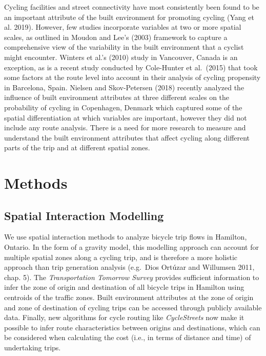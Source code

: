 \documentclass[smallextended]{svjour3}       %
\begin{document}
Cycling facilities and street connectivity have most consistently been
found to be an important attribute of the built environment for
promoting cycling (Yang et al. 2019). However, few studies incorporate
variables at two or more spatial scales, as outlined in Moudon and Lee's
(2003) framework to capture a comprehensive view of the variability in
the built environment that a cyclist might encounter. Winters et al.'s
(2010) study in Vancouver, Canada is an exception, as is a recent study
conducted by Cole-Hunter et al.~(2015) that took some factors at the
route level into account in their analysis of cycling propensity in
Barcelona, Spain. Nielsen and Skov-Petersen (2018) recently analyzed the
influence of built environment attributes at three different scales on
the probability of cycling in Copenhagen, Denmark which captured some of
the spatial differentiation at which variables are important, however
they did not include any route analysis. There is a need for more
research to measure and understand the built environment attributes that
affect cycling along different parts of the trip and at different
spatial zones.

\hypertarget{sec:method}{%
\section{Methods}\label{sec:method}}

\hypertarget{model}{%
\subsection{Spatial Interaction Modelling}\label{model}}

We use spatial interaction methods to analyze bicycle trip flows in
Hamilton, Ontario. In the form of a gravity model, this modelling
approach can account for multiple spatial zones along a cycling trip,
and is therefore a more holistic approach than trip generation analysis
(e.g.~Dios Ortúzar and Willumsen 2011, chap. 5). The
\emph{Transportation Tomorrow Survey} provides sufficient information to
infer the zone of origin and destination of all bicycle trips in
Hamilton using centroids of the traffic zones. Built environment
attributes at the zone of origin and zone of destination of cycling
trips can be accessed through publicly available data. Finally, new
algorithms for cycle routing like \emph{CycleStreets} now make it
possible to infer route characteristics between origins and
destinations, which can be considered when calculating the cost (i.e.,
in terms of distance and time) of undertaking trips.
\end{document}

